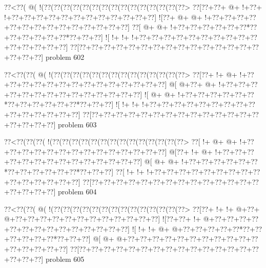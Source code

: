 \vbox{\vbox{\goo
\0??<\0??(\- @(\- !(\0??(\0??(\0??(\0??(\0??(\0??(\0??(\0??(\0??(\0??(\0??(\0??(\0??(\0??(\0??>
\0??[\0??+\0??+\- @+\- !+\0??+\- !+\0??+\0??+\0??+\0??+\0??+\0??+\0??+\0??+\0??+\0??+\0??+\0??]
\- ![\0??+\- @+\- @+\- !+\0??+\0??+\0??+\0??+\0??+\0??+\0??+\0??+\0??+\0??+\0??+\0??+\0??+\0??]
\0??[\- @+\- @+\- !+\0??+\0??+\0??+\0??+\0??+\0??*\0??+\0??+\0??+\0??+\0??+\0??*\0??+\0??+\0??]
\- ![\- !+\- !+\- !+\0??+\0??+\0??+\0??+\0??+\0??+\0??+\0??+\0??+\0??+\0??+\0??+\0??+\0??+\0??]
\0??[\0??+\0??+\0??+\0??+\0??+\0??+\0??+\0??+\0??+\0??+\0??+\0??+\0??+\0??+\0??+\0??+\0??+\0??]
}
\hfil problem 602\hfil\break
}



\vbox{\vbox{\goo
\0??<\0??(\0??(\- @(\- !(\0??(\0??(\0??(\0??(\0??(\0??(\0??(\0??(\0??(\0??(\0??(\0??(\0??(\0??>
\0??[\0??+\- !+\- @+\- !+\0??+\0??+\0??+\0??+\0??+\0??+\0??+\0??+\0??+\0??+\0??+\0??+\0??+\0??]
\- @[\- @+\0??+\- @+\- !+\0??+\0??+\0??+\0??+\0??+\0??+\0??+\0??+\0??+\0??+\0??+\0??+\0??+\0??]
\- ![\- @+\- @+\- !+\0??+\0??+\0??+\0??+\0??+\0??*\0??+\0??+\0??+\0??+\0??+\0??*\0??+\0??+\0??]
\- ![\- !+\- !+\- !+\0??+\0??+\0??+\0??+\0??+\0??+\0??+\0??+\0??+\0??+\0??+\0??+\0??+\0??+\0??]
\0??[\0??+\0??+\0??+\0??+\0??+\0??+\0??+\0??+\0??+\0??+\0??+\0??+\0??+\0??+\0??+\0??+\0??+\0??]
}
\hfil problem 603\hfil\break
}



\vbox{\vbox{\goo
\0??<\0??(\0??(\0??(\- !(\0??(\0??(\0??(\0??(\0??(\0??(\0??(\0??(\0??(\0??(\0??(\0??(\0??(\0??>
\0??[\- !+\- @+\- @+\- !+\0??+\0??+\0??+\0??+\0??+\0??+\0??+\0??+\0??+\0??+\0??+\0??+\0??+\0??]
\- @[\0??+\- !+\- @+\- !+\0??+\0??+\0??+\0??+\0??+\0??+\0??+\0??+\0??+\0??+\0??+\0??+\0??+\0??]
\- @[\- @+\- @+\- !+\0??+\0??+\0??+\0??+\0??+\0??*\0??+\0??+\0??+\0??+\0??+\0??*\0??+\0??+\0??]
\0??[\- !+\- !+\- !+\0??+\0??+\0??+\0??+\0??+\0??+\0??+\0??+\0??+\0??+\0??+\0??+\0??+\0??+\0??]
\0??[\0??+\0??+\0??+\0??+\0??+\0??+\0??+\0??+\0??+\0??+\0??+\0??+\0??+\0??+\0??+\0??+\0??+\0??]
}
\hfil problem 604\hfil\break
}



\vbox{\vbox{\goo
\0??<\0??(\0??(\- @(\- !(\0??(\0??(\0??(\0??(\0??(\0??(\0??(\0??(\0??(\0??(\0??(\0??(\0??(\0??>
\0??[\0??+\- !+\- !+\- @+\0??+\- @+\0??+\0??+\0??+\0??+\0??+\0??+\0??+\0??+\0??+\0??+\0??+\0??]
\- ![\0??+\0??+\- !+\- @+\0??+\0??+\0??+\0??+\0??+\0??+\0??+\0??+\0??+\0??+\0??+\0??+\0??+\0??]
\- ![\- !+\- !+\- @+\- @+\0??+\0??+\0??+\0??+\0??*\0??+\0??+\0??+\0??+\0??+\0??*\0??+\0??+\0??]
\- @[\- @+\- @+\0??+\0??+\0??+\0??+\0??+\0??+\0??+\0??+\0??+\0??+\0??+\0??+\0??+\0??+\0??+\0??]
\0??[\0??+\0??+\0??+\0??+\0??+\0??+\0??+\0??+\0??+\0??+\0??+\0??+\0??+\0??+\0??+\0??+\0??+\0??]
}
\hfil problem 605\hfil\break
}



